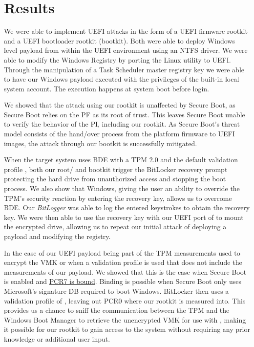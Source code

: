
\chapter{Results}
\label{sec:results}

We were able to implement \ac{UEFI} attacks in the form of a \ac{UEFI} firmware rootkit and a \ac{UEFI} bootloader rootkit (bootkit).
Both were able to deploy Windows level payload from within the \ac{UEFI} environment using an \ac{NTFS} driver.
We were able to modify the Windows Registry by porting the Linux utility  to \ac{UEFI}.
Through the manipulation of a Task Scheduler master registry key we were able to have our Windows payload executed with the privileges of the built-in local system account.
The execution happens at system boot before login.

We showed that the attack using our rootkit is unaffected by Secure Boot, as Secure Boot relies on the \ac{PF} as its root of trust.
This leaves Secure Boot unable to verify the behavior of the \ac{PI}, including our rootkit.
As Secure Boot's threat model consists of the hand\-/over process from the platform firmware to \ac{UEFI} images, the attack through our bootkit is successfully mitigated.

When the target system uses \ac{BDE} with a \ac{TPM} 2.0 and the default validation profile \hyperref[tab:pcr-usage]{}, both our root\-/ and bootkit trigger the BitLocker recovery prompt protecting the hard drive from unauthorized access and stopping the boot process.
We also show that Windows, giving the user an ability to override the \ac{TPM}'s security reaction by entering the recovery key, allows us to overcome \ac{BDE}.
Our \emph{BitLogger} was able to log the entered keystrokes to obtain the recovery key.
We were then able to use the recovery key with our \ac{UEFI} port of  to mount the encrypted drive, allowing us to repeat our initial attack of deploying a payload and modifying the registry.

In the case of our \ac{UEFI} payload being part of the \ac{TPM} measurements used to encrypt the \ac{VMK} or when a validation profile is used that does not include the measurements of our payload.
We showed that this is the case when Secure Boot is enabled and \hyperlink{pcr7-binding}{\ac{PCR}7 is bound}.
Binding is possible when Secure Boot only uses Microsoft's signature \ac{DB} required to boot Windows.
BitLocker then uses a validation profile of \hyperref[tab:pcr-usage]{}, leaving out \ac{PCR}0 where our rootkit is measured into.
This provides us a chance to sniff the communication between the \ac{TPM} and the Windows Boot Manager to retrieve the unencrypted \ac{VMK} for use with , making it possible for our rootkit to gain access to the system without requiring any prior knowledge or additional user input.